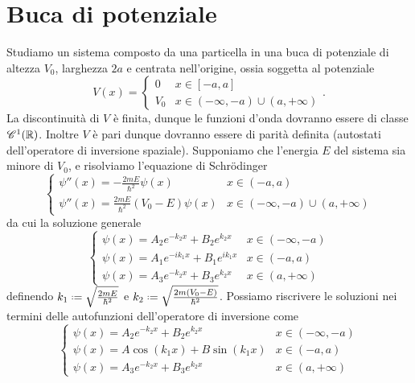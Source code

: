 \section{Buca di potenziale}
Studiamo un sistema composto da una particella in una buca di potenziale di altezza $V_0$, larghezza $2a$ e centrata nell'origine, ossia soggetta al potenziale
\begin{equation}
	V(x)=
	\begin{cases}
		0	&x\in[-a,a]\\
		V_0	&x\in(-\infty,-a)\cup(a,+\infty)
	\end{cases}.
	\label{eq:buca-potenziale-finita}
\end{equation}
La discontinuità di $V$ è finita, dunque le funzioni d'onda dovranno essere di classe $\cont[1]{\R}$.
Inoltre $V$ è pari dunque dovranno essere di parità definita (autostati dell'operatore di inversione spaziale).
Supponiamo che l'energia $E$ del sistema sia minore di $V_0$, e risolviamo l'equazione di Schr\"odinger
\begin{equation}
	\begin{cases}
		\psi''(x)=-\frac{2mE}{\hbar^2}\psi(x)		&x\in(-a,a)\\
		\psi''(x)=\frac{2mE}{\hbar^2}(V_0-E)\psi(x)	&x\in(-\infty,-a)\cup(a,+\infty)
	\end{cases}
	\label{eq:schrodinger-buca-finita}
\end{equation}
da cui la soluzione generale
\begin{equation}
	\begin{cases}
		\psi(x)=A_2e^{-k_2x}+B_2e^{k_2x}	&x\in(-\infty,-a)\\
		\psi(x)=A_1e^{-ik_1x}+B_1e^{ik_1x}	&x\in(-a,a)\\
		\psi(x)=A_3e^{-k_2x}+B_3e^{k_2x}	&x\in(a,+\infty)
	\end{cases}
	\label{eq:soluzione-generale-schrodinger-buca-finita}
\end{equation}
definendo $k_1\defeq\sqrt{\frac{2mE}{\hbar^2}}$ e $k_2\defeq\sqrt{\frac{2m(V_0-E)}{\hbar^2}}$.
Possiamo riscrivere le soluzioni nei termini delle autofunzioni dell'operatore di inversione come
\begin{equation}
	\begin{cases}
		\psi(x)=A_2e^{-k_2x}+B_2e^{k_2x}	&x\in(-\infty,-a)\\
		\psi(x)=A\cos(k_1x)+B\sin(k_1x)		&x\in(-a,a)\\
		\psi(x)=A_3e^{-k_2x}+B_3e^{k_2x}	&x\in(a,+\infty)
	\end{cases}
	\label{eq:schrodinger-buca-potenziale-finita-autofunzioni-inversione}
\end{equation}

